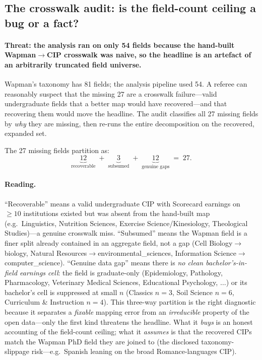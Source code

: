 \documentclass[11pt]{article}
\begin{document}
\subsection{The crosswalk audit: is the field-count ceiling a bug or a fact?}

\paragraph{Threat: the analysis ran on only 54 fields because the hand-built Wapman$\to$CIP crosswalk was naive, so the headline is an artefact of an arbitrarily truncated field universe.}
Wapman's taxonomy has 81 fields; the analysis pipeline used 54. A referee can reasonably suspect that the missing 27 are a crosswalk failure---valid undergraduate fields that a better map would have recovered---and that recovering them would move the headline. The audit classifies all 27 missing fields by \emph{why} they are missing, then re-runs the entire decomposition on the recovered, expanded set.

The 27 missing fields partition as:
\[
\underbrace{12}_{\text{recoverable}} \;+\; \underbrace{3}_{\text{subsumed}} \;+\; \underbrace{12}_{\text{genuine gaps}} \;=\; 27 .
\]

\paragraph{Reading.} ``Recoverable'' means a valid undergraduate CIP with Scorecard earnings on $\ge10$ institutions existed but was absent from the hand-built map (e.g.\ Linguistics, Nutrition Sciences, Exercise Science/Kinesiology, Theological Studies)---a genuine crosswalk miss. ``Subsumed'' means the Wapman field is a finer split already contained in an aggregate field, not a gap (Cell Biology$\to$biology, Natural Resources$\to$environmental\_sciences, Information Science$\to$computer\_science). ``Genuine data gap'' means there is \emph{no clean bachelor's-in-field earnings cell}: the field is graduate-only (Epidemiology, Pathology, Pharmacology, Veterinary Medical Sciences, Educational Psychology, $\ldots$) or its bachelor's cell is suppressed at small $n$ (Classics $n=3$, Soil Science $n=6$, Curriculum \& Instruction $n=4$). This three-way partition is the right diagnostic because it separates a \emph{fixable} mapping error from an \emph{irreducible} property of the open data---only the first kind threatens the headline. What it \emph{buys} is an honest accounting of the field-count ceiling; what it \emph{assumes} is that the recovered CIPs match the Wapman PhD field they are joined to (the disclosed taxonomy-slippage risk---e.g.\ Spanish leaning on the broad Romance-languages CIP).
\end{document}
